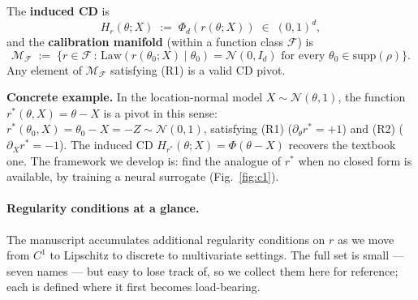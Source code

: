 \documentclass[11pt]{article}
\begin{document}
The \textbf{induced CD} is \[
H_r(\theta; X) \;:=\; \Phi_d(r(\theta; X)) \;\in\; (0,1)^d,
\] and the \textbf{calibration manifold} (within a function class
\(\mathcal{F}\)) is \[
\mathcal{M}_\mathcal{F} \;:=\; \bigl\{r \in \mathcal{F} \,:\, \mathrm{Law}(r(\theta_0; X) \mid \theta_0) = \mathcal{N}(0, I_d) \text{ for every } \theta_0 \in \mathrm{supp}(\rho)\bigr\}.
\] Any element of \(\mathcal{M}_\mathcal{F}\) satisfying (R1) is a valid
CD pivot.

\textbf{Concrete example.} In the location-normal model
\(X \sim \mathcal{N}(\theta, 1)\), the function
\(r^*(\theta, X) = \theta - X\) is a pivot in this sense:
\(r^*(\theta_0, X) = \theta_0 - X = -Z \sim \mathcal{N}(0,1)\),
satisfying (R1) (\(\partial_\theta r^* = +1\)) and (R2)
(\(\partial_X r^* = -1\)). The induced CD
\(H_{r^*}(\theta; X) = \Phi(\theta - X)\) recovers the textbook one. The
framework we develop is: find the analogue of \(r^*\) when no closed
form is available, by training a neural surrogate (Fig.~\ref{fig:c1}).

\paragraph{Regularity conditions at a glance.} The manuscript accumulates
additional regularity conditions on \(r\) as we move from \(C^1\) to
Lipschitz to discrete to multivariate settings. The full set is
small --- seven names --- but easy to lose track of, so we collect them
here for reference; each is defined where it first becomes load-bearing.
\end{document}
